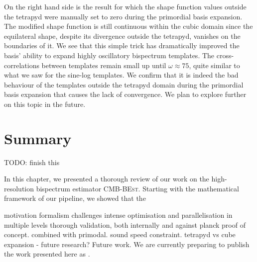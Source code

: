 On the right hand side is the result for which the shape function values outside the tetrapyd were manually set to zero during the primordial basis expansion. The modified shape function is still continuous within the cubic domain since the equilateral shape, despite its divergence outside the tetrapyd, vanishes on the boundaries of it. We see that this simple trick has dramatically improved the basis' ability to expand highly oscillatory bispectrum templates. The cross-correlations between templates remain small up until $\omega\approx75$, quite similar to what we saw for the sine-log templates. We confirm that it is indeed the bad behaviour of the templates outside the tetrapyd domain during the primordial basis expansion that causes the lack of convergence. We plan to explore further on this topic in the future.

\newpage
\section*{Summary}
TODO: finish this


In this chapter, we presented a thorough review of our work on the high-resolution bispectrum estimator \textsc{CMB-BEst}. Starting with the mathematical framework of our pipeline, we showed that the

motivation
formalism
challenges
intense optimisation and parallelisation in multiple levels
thorough validation, both internally and against planck
proof of concept. combined with primodal. sound speed constraint.
tetrapyd vs cube expansion - future research?
Future work.
We are currently preparing to publish the work presented here as \cite{Sohn2021inprep}.




%		
%		
%		

